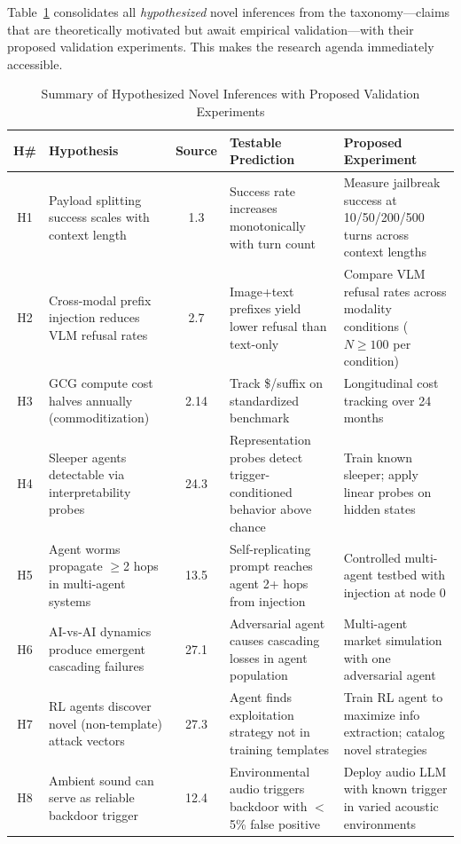 \documentclass[conference]{IEEEtran}
\newcommand{\tableheaderrow}{\rowcolor{accentblue}}
\renewcommand{\thead}[1]{\textbf{\color{white}\sffamily #1}}
\begin{document}
Table~\ref{tab:hypotheses} consolidates all \emph{hypothesized} novel inferences from the taxonomy---claims that are theoretically motivated but await empirical validation---with their proposed validation experiments. This makes the research agenda immediately accessible.

\begin{table}[!htbp]
\centering
\caption{Summary of Hypothesized Novel Inferences with Proposed Validation Experiments}
\label{tab:hypotheses}
\renewcommand{\arraystretch}{1.1}
\scriptsize\sffamily
\begin{tabular}{cp{3.5cm}cp{4.0cm}p{4.0cm}}
\toprule
\tableheaderrow \thead{H\#} & \thead{Hypothesis} & \thead{Source} & \thead{Testable Prediction} & \thead{Proposed Experiment} \\
\midrule
H1 & Payload splitting success scales with context length & 1.3 & Success rate increases monotonically with turn count & Measure jailbreak success at 10/50/200/500 turns across context lengths \\
\midrule
H2 & Cross-modal prefix injection reduces VLM refusal rates & 2.7 & Image+text prefixes yield lower refusal than text-only & Compare VLM refusal rates across modality conditions ($N{\geq}100$ per condition) \\
\midrule
H3 & GCG compute cost halves annually (commoditization) & 2.14 & Track \$/suffix on standardized benchmark & Longitudinal cost tracking over 24 months \\
\midrule
H4 & Sleeper agents detectable via interpretability probes & 24.3 & Representation probes detect trigger-conditioned behavior above chance & Train known sleeper; apply linear probes on hidden states \\
\midrule
H5 & Agent worms propagate $\geq$2 hops in multi-agent systems & 13.5 & Self-replicating prompt reaches agent 2+ hops from injection & Controlled multi-agent testbed with injection at node 0 \\
\midrule
H6 & AI-vs-AI dynamics produce emergent cascading failures & 27.1 & Adversarial agent causes cascading losses in agent population & Multi-agent market simulation with one adversarial agent \\
\midrule
H7 & RL agents discover novel (non-template) attack vectors & 27.3 & Agent finds exploitation strategy not in training templates & Train RL agent to maximize info extraction; catalog novel strategies \\
\midrule
H8 & Ambient sound can serve as reliable backdoor trigger & 12.4 & Environmental audio triggers backdoor with $<$5\% false positive & Deploy audio LLM with known trigger in varied acoustic environments \\

\end{tabular}
\end{table}
\end{document}
